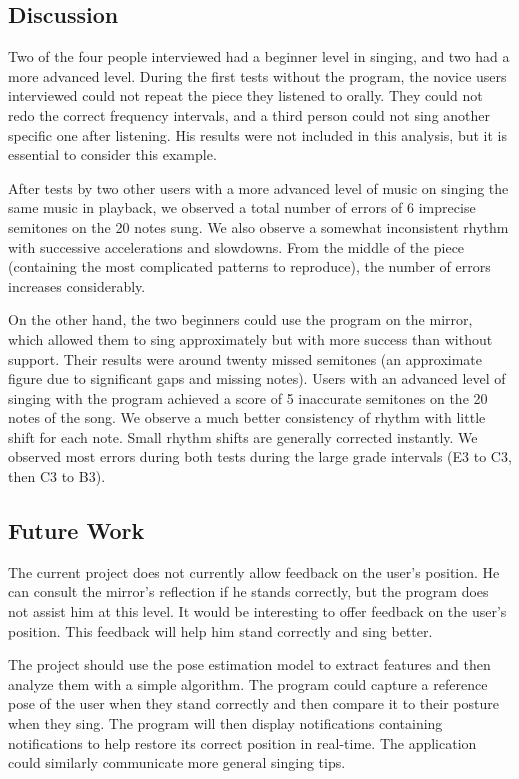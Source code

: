 \subsection{Discussion}

Two of the four people interviewed had a beginner level in singing, and two had a more advanced level. During the first tests without the program, the novice users interviewed could not repeat the piece they listened to orally. They could not redo the correct frequency intervals, and a third person could not sing another specific one after listening. His results were not included in this analysis, but it is essential to consider this example. 

After tests by two other users with a more advanced level of music on singing the same music in playback, we observed a total number of errors of 6 imprecise semitones on the 20 notes sung. We also observe a somewhat inconsistent rhythm with successive accelerations and slowdowns. From the middle of the piece (containing the most complicated patterns to reproduce), the number of errors increases considerably.

On the other hand, the two beginners could use the program on the mirror, which allowed them to sing approximately but with more success than without support. Their results were around twenty missed semitones (an approximate figure due to significant gaps and missing notes). Users with an advanced level of singing with the program achieved a score of 5 inaccurate semitones on the 20 notes of the song. We observe a much better consistency of rhythm with little shift for each note. 
Small rhythm shifts are generally corrected instantly. We observed most errors during both tests during the large grade intervals (E3 to C3, then C3 to B3).

\subsection{Future Work}

The current project does not currently allow feedback on the user's position. He can consult the mirror's reflection if he stands correctly, but the program does not assist him at this level. It would be interesting to offer feedback on the user's position. This feedback will help him stand correctly and sing better. 

The project should use the pose estimation model to extract features and then analyze them with a simple algorithm. The program could capture a reference pose of the user when they stand correctly and then compare it to their posture when they sing. The program will then display notifications containing notifications to help restore its correct position in real-time. The application could similarly communicate more general singing tips. 

